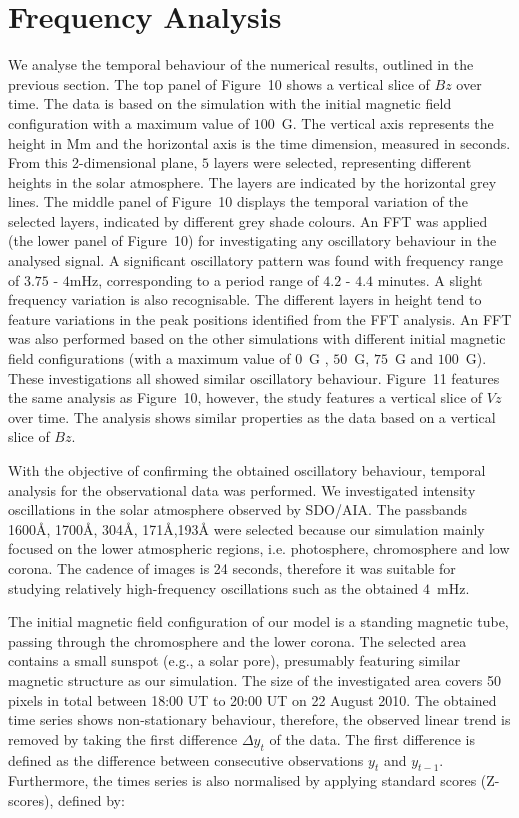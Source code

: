\documentclass[physics,article,submit,pdftex,moreauthors]{Definitions/mdpi}
\begin{document}
\section{Frequency Analysis}

 We analyse the temporal behaviour of the numerical results, outlined in the previous section. The top panel of Figure~10 shows a vertical slice of $Bz$ over time.  The data is based on the simulation with the initial magnetic field configuration with a maximum value of $100$~G. The vertical axis represents the height in Mm and the horizontal axis is the time dimension, measured in seconds. From this 2-dimensional plane, $5$ layers were selected, representing different heights in the solar atmosphere. The layers are indicated by the horizontal grey lines.   The middle panel of Figure~10 displays the temporal variation of the selected layers, indicated by different grey shade colours. An FFT was applied (the lower panel of Figure~10) for investigating any oscillatory behaviour in the analysed signal. A significant oscillatory pattern was found with frequency range of $3.75$ - $4$mHz, corresponding to a period range of $4.2$ - $4.4$ minutes. A slight frequency variation is also recognisable. The different layers in height tend to feature variations in the peak positions identified from the FFT analysis. An FFT was also performed based on the other simulations with different initial magnetic field configurations (with a maximum value of $0$~G , $50$~G,  $75$~G  and $100$~G). These investigations all showed similar oscillatory behaviour.  Figure~11 features the same analysis as Figure~10, however, the study features a vertical slice of $Vz$ over time. The analysis shows similar properties as the data based on a vertical slice of $Bz$.

With the objective of confirming the obtained oscillatory behaviour, temporal analysis for the observational data was performed. We investigated intensity oscillations in the solar atmosphere observed by SDO/AIA. The passbands 1600{\AA}, 1700{\AA}, 304{\AA}, 171{\AA},193{\AA} were selected because our simulation mainly focused on the lower atmospheric regions, i.e. photosphere, chromosphere and low corona. The cadence of images is 24 seconds, therefore it was suitable for studying relatively high-frequency oscillations such as the obtained $4$~mHz.

The initial magnetic field configuration of our model is a standing magnetic tube, passing through the chromosphere and the lower corona. The selected area contains a small sunspot (e.g., a solar pore), presumably featuring similar magnetic structure as our simulation. The size of the investigated area covers 50 pixels in total between 18:00 UT to 20:00 UT on 22 August 2010. The obtained time series shows non-stationary behaviour, therefore, the observed linear trend is removed by taking the first difference $\Delta  y_{t}$ of the data. The first difference is defined as the difference between consecutive observations $y_{t}$ and $y_{t-1}$. Furthermore, the times series is also normalised by applying standard scores (Z-scores), defined by:
\end{document}
